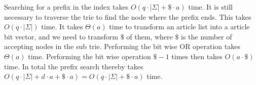 Searching for a prefix in the index takes $O(q\cdot |\Sigma| + \$ \cdot a)$ time. It is still necessary to traverse the trie to find the node where the prefix ends. This takes $O(q\cdot |\Sigma|)$ time. It takes $\Theta(a)$ time to transform an article list into a article bit vector, and we need to transform $\$$ of them, where $\$$ is the number of accepting nodes in the sub trie. Performing the bit wise OR operation takes $\Theta(a)$ time. Performing the bit wise operation $\$-1$ times then takes $O(a \cdot \$)$ time. In total the prefix search thereby takes $O(q\cdot |\Sigma| + d\cdot a + \$\cdot a) = O(q\cdot |\Sigma| + \$\cdot a)$ time. 

 
